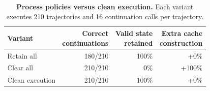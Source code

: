 \begin{table}[!ht]
\centering
\caption{\textbf{Process policies versus clean execution.}
Each variant executes 210 trajectories and 16 continuation calls per trajectory.}
\label{tab:process-state}
\footnotesize
\setlength{\tabcolsep}{4pt}
\begin{tabular}{@{}lrrr@{}}
\toprule
Variant & \shortstack{Correct\\continuations} & \shortstack{Valid state\\retained} & \shortstack{Extra cache\\construction} \\
\midrule
Retain all & 180/210 & 100\% & +0\% \\
Clear all & 210/210 & 0\% & +100\% \\
Clean execution & 210/210 & 100\% & +0\% \\
\bottomrule
\end{tabular}
\end{table}
